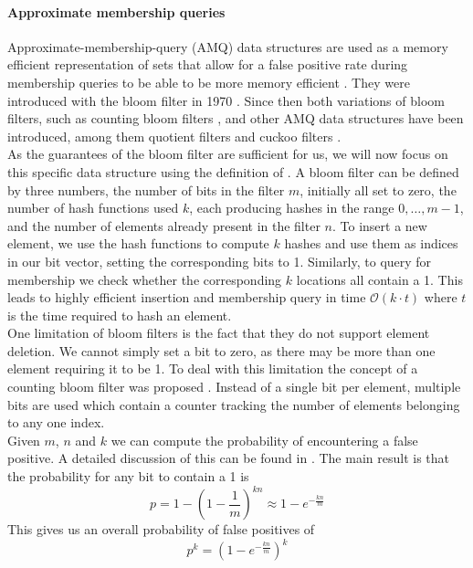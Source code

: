 \paragraph{Approximate membership queries}
Approximate-membership-query (AMQ) data structures are used as a memory efficient representation of sets that allow for a false positive rate during membership queries to be able to be more memory efficient \cite{bender2011don}. They were introduced with the bloom filter in 1970 \cite{bloom1970space}. Since then both variations of bloom filters, such as counting bloom filters \cite{fan2000summary}, and other AMQ data structures have been introduced, among them quotient filters \cite{bender2011don} and cuckoo filters \cite{fan2014cuckoo}. \\
As the guarantees of the bloom filter are sufficient for us, we will now focus on this specific data structure using the definition of \cite{bloom1970space}. A bloom filter can be defined by three numbers, the number of bits in the filter $m$, initially all set to zero, the number of hash functions used $k$, each producing hashes in the range $0, \ldots, m-1$, and the number of elements already present in the filter $n$. To insert a new element, we use the hash functions to compute $k$ hashes and use them as indices in our bit vector, setting the corresponding bits to 1. Similarly, to query for membership we check whether the corresponding $k$ locations all contain a 1. This leads to highly efficient insertion and membership query in time $\mathcal{O}(k \cdot t)$ where $t$ is the time required to hash an element. \\
One limitation of bloom filters is the fact that they do not support element deletion. We cannot simply set a bit to zero, as there may be more than one element requiring it to be 1. To deal with this limitation the concept of a counting bloom filter was proposed \cite{fan2000summary}. Instead of a single bit per element, multiple bits are used which contain a counter tracking the number of elements belonging to any one index. \\
Given $m$, $n$ and $k$ we can compute the probability of encountering a false positive. A detailed discussion of this can be found in \cite{broder2004network}. The main result is that the probability for any bit to contain a 1 is
\[
	p = 1 - \left( 1 - \frac{1}{m} \right)^{kn} \approx 1 - e^{-\frac{kn}{m}}
\]
This gives us an overall probability of false positives of
\[
	p^k = \left(1 - e^{-\frac{kn}{m}}\right)^k
\]
